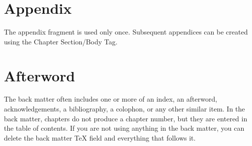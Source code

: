 \documentclass{book}
\begin{document}
%

\bigskip

\appendix

\chapter{Appendix}

The appendix fragment is used only once. Subsequent appendices can be
created using the Chapter Section/Body Tag.

\backmatter

\chapter{Afterword}

The back matter often includes one or more of an index, an afterword,
acknowledgements, a bibliography, a colophon, or any other similar item. In
the back matter, chapters do not produce a chapter number, but they are
entered in the table of contents. If you are not using anything in the back
matter, you can delete the back matter TeX field and everything that follows
it.
\end{document}
